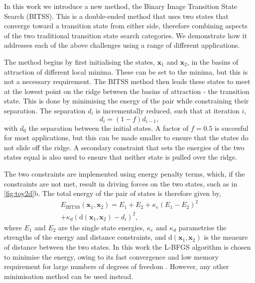 \documentclass[aps,prl,twocolumn,10pt,groupedaddress]{revtex4-2}
\begin{document}
In this work we introduce a new method, the Binary Image Transition State Search (BITSS).
This is a double-ended method that uses two states that converge toward a transition state from either side, therefore combining aspects of the two traditional transition state search categories.
We demonstrate how it addresses each of the above challenges using a range of different applications.


The method begins by first initialising the states, $\bm{x}_1$ and $\bm{x}_2$, in the basins of attraction of different local minima.
These can be set to the minima, but this is not a necessary requirement.
The BITSS method then leads these states to meet at the lowest point on the ridge between the basins of attraction - the transition state.
This is done by minimising the energy of the pair while constraining their separation.
The separation $d_i$ is incrementally reduced, such that at iteration $i$,
\begin{equation}\label{eq:diteration}
  d_i = (1 - f) d_{i-1},
\end{equation}
with $d_0$ the separation between the initial states.
A factor of $f = 0.5$ is succesful for most applications, but this can be made smaller to ensure that the states do not slide off the ridge.
A secondary constraint that sets the energies of the two states equal is also used to ensure that neither state is pulled over the ridge.

The two constraints are implemented using energy penalty terms, which, if the constraints are not met, result in driving forces on the two states, such as in \cref{fig:toy2d}b.
The total energy of the pair of states is therefore given by,
\begin{multline}\label{eq:bitss}
  E_\text{BITSS}(\bm{x}_1, \bm{x}_2) = E_1 + E_2
    + \kappa_e \left( E_1 - E_2 \right) ^2 \\
    + \kappa_d \left( \mathrm{d}(\bm{x}_1, \bm{x}_2) - d_i \right) ^2,
\end{multline}
where $E_1$ and $E_2$ are the single state energies, $\kappa_e$ and $\kappa_d$ parametrise the strengths of the energy and distance constraints, and $\mathrm{d}(\bm{x}_1, \bm{x}_2)$ is the measure of distance between the two states.
In this work the L-BFGS algorithm is chosen to minimise the energy, owing to its fast convergence and low memory requirement for large numbers of degrees of freedom \cite{Liu1989}.
However, any other minimisation method can be used instead.
\end{document}
